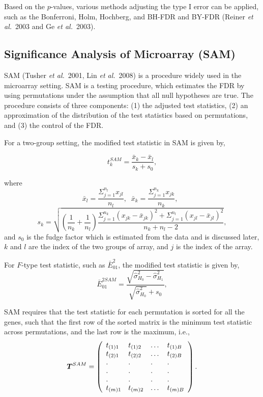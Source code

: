 Based on the $p$-values, various methods adjusting the type I error
can be applied, such as the Bonferroni, Holm, Hochberg, and BH-FDR
and BY-FDR (Reiner \textit{et al.}\ 2003 and Ge \textit{et al.}\
2003).

\subsection{Significance Analysis of Microarray (SAM)}

SAM (Tusher \textit{et al.}\ 2001, Lin \textit{et al.}\ 2008) is a procedure widely used in the
microarray setting. SAM is a testing procedure, which estimates the
FDR by using permutations under the assumption that all null
hypotheses are true. The procedure consists of three components: (1)
the adjusted test statistics, (2) an approximation of the
distribution of the test statistics based on permutations, and (3)
the control of the FDR.

For a two-group setting, the modified test statistic in SAM is given
by,

\begin{equation}
t_{k}^{SAM}= \frac{\bar{x}_{k}-\bar{x}_{l}} {s_{k}+s_{0}},
\label{ttestSAM}
\end{equation}

where \[ \bar{x}_{l}=\frac{\Sigma_{j=1}^{n_{l}} x_{jl}}{n_{l}},\;\;
\bar{x}_{k}=\frac{\Sigma_{j=1}^{n_{k}} x_{jk}}{n_{k}},\;\;\]
\[s_{k}=\sqrt{\left (\frac{1}{n_{k}}+\frac{1}{n_{l}} \right )
{\frac{\Sigma_{j=1}^{n_{k}}
   (x_{jk}-\bar{x}_{jk})^2+\Sigma_{j=1}^{n_{l}}
   (x_{jl}-\bar{x}_{jl})^2}{n_{k}+n_{l}-2}}},
   \]
and $s_0$ is the fudge factor which is estimated from the data and
is discussed later, $k$ and $l$ are the index of the two groups of
array, and $j$ is the index of the array.

For $F$-type test statistic, such as $\bar{E}_{01}^2$, the modified test
statistic is given by,
\begin{equation}
\bar{E}_{01}^{2SAM}= \frac{\sqrt{\hat{\sigma}^2_{H_0}-\hat{\sigma}^2_{H_1}}} {\sqrt{\hat{\sigma}^2_{H_0}}+s_{0}},
\label{ttestSAM}
\end{equation}






SAM requires that the test statistic for each permutation is sorted
for all the genes, such that the first row of the sorted matrix is
the minimum test statistic across permutations, and the last row is
the maximum, i.e.,
\[\mbox{\boldmath $T$}^{SAM}= \left (
\begin{array}{llll}
t_{(1)1} & t_{(1)2} & \dots & t_{(1)B}\\
t_{(2)1} & t_{(2)2} & \dots & t_{(2)B}\\
.    & .    &.      & .     \\
.    & .    &.      & .     \\
.    & .    &.      & .     \\
t_{(m)1} & t_{(m)2} & \dots & t_{(m)B}\\
\end{array}
\right ).
\]

